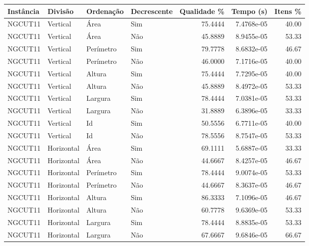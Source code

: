 \begin{tabular}{llllrrr}
    \hline
    Instância & Divisão     & Ordenação & Decrescente & Qualidade \% & Tempo (s)  & Itens \% \\
    \hline
    NGCUT11   & Vertical    & Área      & Sim         & 75.4444      & 7.4768e-05 & 40.00    \\
    NGCUT11   & Vertical    & Área      & Não         & 45.8889      & 8.9455e-05 & 53.33    \\
    NGCUT11   & Vertical    & Perímetro & Sim         & 79.7778      & 8.6832e-05 & 46.67    \\
    NGCUT11   & Vertical    & Perímetro & Não         & 46.0000      & 7.1716e-05 & 40.00    \\
    NGCUT11   & Vertical    & Altura    & Sim         & 75.4444      & 7.7295e-05 & 40.00    \\
    NGCUT11   & Vertical    & Altura    & Não         & 45.8889      & 8.4972e-05 & 53.33    \\
    NGCUT11   & Vertical    & Largura   & Sim         & 78.4444      & 7.0381e-05 & 53.33    \\
    NGCUT11   & Vertical    & Largura   & Não         & 31.8889      & 6.3896e-05 & 33.33    \\
    NGCUT11   & Vertical    & Id        & Sim         & 50.5556      & 6.7711e-05 & 40.00    \\
    NGCUT11   & Vertical    & Id        & Não         & 78.5556      & 8.7547e-05 & 53.33    \\
    NGCUT11   & Horizontal  & Área      & Sim         & 69.1111      & 5.6887e-05 & 33.33    \\
    NGCUT11   & Horizontal  & Área      & Não         & 44.6667      & 8.4257e-05 & 46.67    \\
    NGCUT11   & Horizontal  & Perímetro & Sim         & 78.4444      & 9.0074e-05 & 53.33    \\
    NGCUT11   & Horizontal  & Perímetro & Não         & 44.6667      & 8.3637e-05 & 46.67    \\
    NGCUT11   & Horizontal  & Altura    & Sim         & 86.3333      & 7.1096e-05 & 46.67    \\
    NGCUT11   & Horizontal  & Altura    & Não         & 60.7778      & 9.6369e-05 & 53.33    \\
    NGCUT11   & Horizontal  & Largura   & Sim         & 78.4444      & 8.8835e-05 & 53.33    \\
    NGCUT11   & Horizontal  & Largura   & Não         & 67.6667      & 9.6846e-05 & 66.67    \\

\end{tabular}
